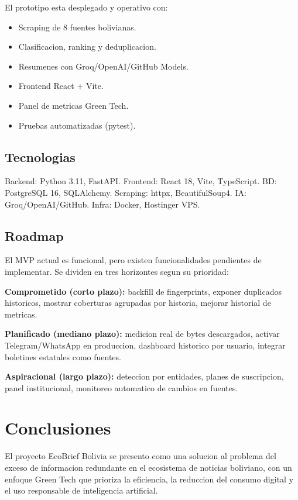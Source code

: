 \documentclass[12pt,oneside]{report}
\begin{document}
El prototipo esta desplegado y operativo con:
\begin{itemize}[nosep]
    \item Scraping de 8 fuentes bolivianas.
    \item Clasificacion, ranking y deduplicacion.
    \item Resumenes con Groq/OpenAI/GitHub Models.
    \item Frontend React + Vite.
    \item Panel de metricas Green Tech.
    \item Pruebas automatizadas (pytest).
\end{itemize}

\section{Tecnologias}

Backend: Python 3.11, FastAPI. Frontend: React 18, Vite, TypeScript. BD: PostgreSQL 16, SQLAlchemy. Scraping: httpx, BeautifulSoup4. IA: Groq/OpenAI/GitHub. Infra: Docker, Hostinger VPS.

\section{Roadmap}

El MVP actual es funcional, pero existen funcionalidades pendientes de implementar. Se dividen en tres horizontes segun su prioridad:

\textbf{Comprometido (corto plazo):} backfill de fingerprints, exponer duplicados historicos, mostrar coberturas agrupadas por historia, mejorar historial de metricas.

\textbf{Planificado (mediano plazo):} medicion real de bytes descargados, activar Telegram/WhatsApp en produccion, dashboard historico por usuario, integrar boletines estatales como fuentes.

\textbf{Aspiracional (largo plazo):} deteccion por entidades, planes de suscripcion, panel institucional, monitoreo automatico de cambios en fuentes.

\chapter*{Conclusiones}

El proyecto EcoBrief Bolivia se presento como una solucion al problema del exceso de informacion redundante en el ecosistema de noticias boliviano, con un enfoque Green Tech que prioriza la eficiencia, la reduccion del consumo digital y el uso responsable de inteligencia artificial.
\end{document}
